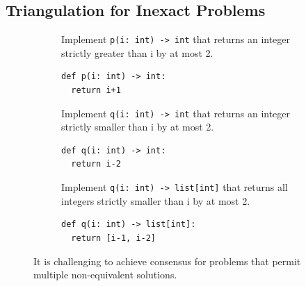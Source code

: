 \documentclass[acmsmall,screen,nonacm]{acmart}
\begin{document}
\subsection{Triangulation for Inexact Problems}
\label{sec:inexact}

\begin{figure}[t]
    \centering
    \begin{subfigure}[t]{0.32\textwidth}
    {\scriptsize
      \begin{tcolorbox}[mybox,title={Original problem $d$}]
Implement \texttt{p(i: int) -> int} that returns an integer strictly greater than i by at most 2.
      \end{tcolorbox}
      \begin{tcolorbox}[mybox,title=Sample $p$]
        \begin{verbatim}
def p(i: int) -> int:
  return i+1
        \end{verbatim}
    \end{tcolorbox}
    }
    \end{subfigure}%
    \hfill
\begin{subfigure}[t]{0.32\textwidth}
    {\scriptsize
      \begin{tcolorbox}[mybox,title={Inverse problem $d^{-1}$}]
Implement \texttt{q(i: int) -> int} that returns an integer strictly smaller than i by at most 2.
      \end{tcolorbox}
      \begin{tcolorbox}[mybox,title=Sample $q$]
        \begin{verbatim}
def q(i: int) -> int:
  return i-2
        \end{verbatim}
    \end{tcolorbox}
    }
\end{subfigure}
    \hfill
\begin{subfigure}[t]{0.32\textwidth}
    {\scriptsize
      \begin{tcolorbox}[mybox,title={Set-valued inverse problem $d^{\succ}$}]
Implement \texttt{q(i: int) -> list[int]} that returns all integers strictly smaller than i by at most 2.
      \end{tcolorbox}
      \begin{tcolorbox}[mybox,title=Sample $q'$]
        \begin{verbatim}
def q(i: int) -> list[int]:
  return [i-1, i-2]
        \end{verbatim}
    \end{tcolorbox}
    }
\end{subfigure}
\vspace{-3mm}
\caption{\label{fig:inexact_challenge}It is challenging to achieve consensus for problems that permit multiple non-equivalent solutions.}
\end{figure}
\end{document}

